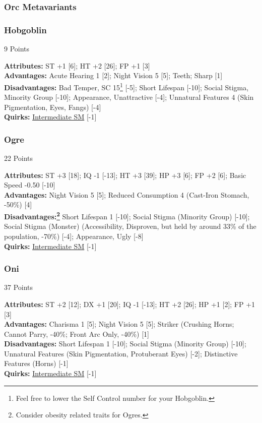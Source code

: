 \begin{multicols*}{3}
	\subsubsection{Orc Metavariants}
	
	\subsubsection*{Hobgoblin}
	\begin{flushright}
		9 Points
	\end{flushright}
	\textbf{Attributes:} 
	ST +1 [6]; HT +2 [26]; FP +1 [3]
	\\\textbf{Advantages:} 
	Acute Hearing 1 [2]; Night Vision 5 [5]; Teeth; Sharp [1]
	\\\textbf{Disadvantages:} 
	Bad Temper, SC 15\footnote{Feel free to lower the Self Control number for your Hobgoblin.} [-5]; Short Lifespan [-10]; Social Stigma, Minority Group [-10]; Appearance, Unattractive [-4]; Unnatural Features 4 (Skin Pigmentation, Eyes, Fangs) [-4]
	\\\textbf{Quirks:}
	\hyperref[intermediate_sm]{Intermediate SM} [-1]
	
	\subsubsection*{Ogre}
	\begin{flushright}
		22 Points
	\end{flushright}
	\textbf{Attributes:} 
	ST +3 [18]; IQ -1 [-13]; HT +3 [39]; HP +3 [6]; FP +2 [6]; Basic Speed -0.50 [-10]
	\\\textbf{Advantages:} 
	Night Vision 5 [5]; Reduced Consumption 4 (Cast-Iron Stomach, -50\%) [4]
	\\\textbf{Disadvantages:\footnote{Consider obesity related traits for Ogres.}} 
	Short Lifespan 1 [-10]; Social Stigma (Minority Group) [-10]; Social Stigma (Monster) (Accessibility, Disproven, but held by around 33\% of the population, -70\%) [-4]; Appearance, Ugly [-8]
	\\\textbf{Quirks:}
	\hyperref[intermediate_sm]{Intermediate SM} [-1]
	
	\subsubsection*{Oni}
	\begin{flushright}
		37 Points
	\end{flushright}
	\textbf{Attributes:} 
	ST +2 [12]; DX +1 [20]; IQ -1 [-13]; HT +2 [26]; HP +1 [2]; FP +1 [3]
	\\\textbf{Advantages:} 
	Charisma 1 [5]; Night Vision 5 [5]; Striker (Crushing Horns; Cannot Parry, -40\%; Front Arc Only, -40\%) [1]
	\\\textbf{Disadvantages:} 
	Short Lifespan 1 [-10]; Social Stigma (Minority Group) [-10]; Unnatural Features (Skin Pigmentation, Protuberant Eyes) [-2]; Distinctive Features (Horns) [-1]
	\\\textbf{Quirks:}
	\hyperref[intermediate_sm]{Intermediate SM} [-1]
	

\end{multicols*}
